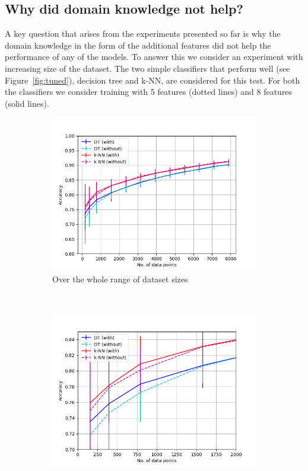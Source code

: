 \documentclass{article}
\begin{document}
\subsection{Why did domain knowledge not help?}
A key question that arises from the experiments presented so far is why the domain knowledge in the form of the additional features did not help the performance of any of the models. To answer this we consider an experiment with increasing size of the dataset. The two simple classifiers that perform well (see Figure~\ref{fig:tuned}), decision tree and k-NN, are considered for this test. For both the classifiers we consider training with 5 features (dotted lines) and 8 features (solid lines). 


\begin{figure}[h!]
    \centering
    \begin{subfigure}[b]{0.475\textwidth}
        \includegraphics[width=\textwidth]{figures/accuracy_vs_size.png}
        \caption{Over the whole range of dataset sizes}
        \label{fig:acc_vs_size_a}
    \end{subfigure}
    ~ %
    \begin{subfigure}[b]{0.475\textwidth}
        \includegraphics[width=\textwidth]{figures/accuracy_vs_size2.png}

\end{subfigure}
\end{figure}
\end{document}
